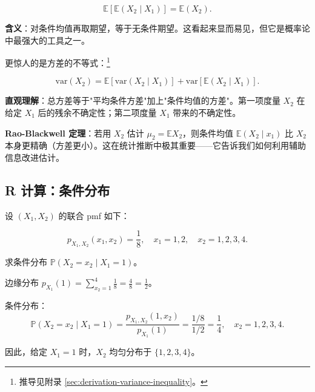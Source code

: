 \begin{theorem}[全期望公式]\label{th:law-total-expectation-ch2}
\begin{equation}\label{eq:law-total-expectation}
\mathbb{E}[\mathbb{E}(X_2 \mid X_1)] = \mathbb{E}(X_2).
\tag{2.3.1}
\end{equation}
\end{theorem}

\textbf{含义}：对条件均值再取期望，等于无条件期望。这看起来显而易见，但它是概率论中最强大的工具之一。

更惊人的是方差的不等式：\footnote{推导见附录 \cref{sec:derivation-variance-inequality}。}

\begin{theorem}[条件方差公式]\label{th:law-total-variance-ch2}
\begin{equation}\label{eq:law-total-variance}
\text{var}(X_2) = \mathbb{E}[\text{var}(X_2 \mid X_1)] + \text{var}[\mathbb{E}(X_2 \mid X_1)].
\tag{2.3.2}
\end{equation}
\end{theorem}

\textbf{直观理解}：总方差等于"平均条件方差"加上"条件均值的方差"。第一项度量 $X_2$ 在给定 $X_1$ 后的残余不确定性；第二项度量 $X_1$ 带来的不确定性。

\textbf{Rao-Blackwell 定理}：若用 $X_2$ 估计 $\mu_2 = \mathbb{E}X_2$，则条件均值 $\mathbb{E}(X_2 \mid x_1)$ 比 $X_2$ 本身更精确（方差更小）。这在统计推断中极其重要——它告诉我们如何利用辅助信息改进估计。

\subsection{R 计算：条件分布}

\begin{example}[离散条件分布]\label{ex:conditional-distribution-discrete-ch2}
设 $(X_1, X_2)$ 的联合 pmf 如下：

\[
p_{X_1, X_2}(x_1, x_2) = \frac{1}{8}, \quad x_1 = 1,2, \quad x_2 = 1,2,3,4.
\]

求条件分布 $\mathbb{P}(X_2 = x_2 \mid X_1 = 1)$。

边缘分布 $p_{X_1}(1) = \sum_{x_2=1}^4 \frac{1}{8} = \frac{4}{8} = \frac{1}{2}$。

条件分布：
\[
\mathbb{P}(X_2 = x_2 \mid X_1 = 1) = \frac{p_{X_1,X_2}(1,x_2)}{p_{X_1}(1)} = \frac{1/8}{1/2} = \frac{1}{4}, \quad x_2 = 1,2,3,4.
\]

因此，给定 $X_1 = 1$ 时，$X_2$ 均匀分布于 $\{1,2,3,4\}$。
\end{example}


